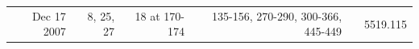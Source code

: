 \documentclass[a4paper,12pt]{article}
\begin{document}
\begin{table}
\begin{tabular}{rrrrrr}
                                                                                                                                                                                                                                                                                                                                                                                                                                                                                                                                                                                                                                                                                                                                                                                                                                                                                                                                                                                                                                                                                                                                                                                                                                                        Dec 17 2007 & 8, 25, 27 & 18 at 170-174 & 135-156, 270-290, 300-366, 445-449 &       & 5519.115 \\

\end{tabular}
\end{table}
\end{document}
